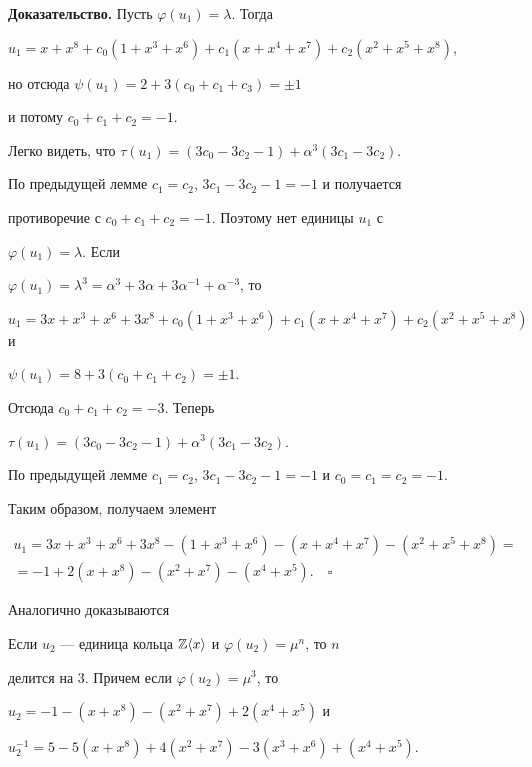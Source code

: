  


{\bf Доказательство.} Пусть $\varphi(u_1)=\lambda$. Тогда 


$u_1=x+x^8+c_0(1+x^3+x^6)+c_1(x+x^4+x^7)+c_2(x^2+x^5+x^8)$, 


но отсюда $\psi(u_1)=2+3(c_0+c_1+c_3)=\pm1$ 


и потому $c_0+c_1+c_2=-1$. 


Легко видеть, что $\tau(u_1)=(3c_0-3c_2-1)+\alpha^3(3c_1-3c_2)$. 


По предыдущей лемме $c_1=c_2$, $3c_1-3c_2-1=-1$ и получается 


противоречие с $c_0+c_1+c_2=-1$. Поэтому нет единицы $u_1$ с 


$\varphi(u_1)=\lambda$. Если 


$\varphi(u_1)=\lambda^3=\alpha^3+3\alpha+3\alpha^{-1}+\alpha^{-3}$, то 


$u_1=3x+x^3+x^6+3x^8+c_0(1+x^3+x^6)+c_1(x+x^4+x^7)+c_2(x^2+x^5+x^8)$ и 


$\psi(u_1)=8+3(c_0+c_1+c_2)=\pm1$. 


Отсюда $c_0+c_1+c_2=-3$. Теперь 


$\tau(u_1)=(3c_0-3c_2-1)+\alpha^3(3c_1-3c_2)$. 


По предыдущей лемме $c_1=c_2$, $3c_1-3c_2-1=-1$ и $c_0=c_1=c_2=-1$. 


Таким образом, получаем элемент 


\begin{multline*} 


u_1=3x+x^3+x^6+3x^8-(1+x^3+x^6)-(x+x^4+x^7)- 


(x^2+x^5+x^8) = \\ 


% 


=-1+2(x+x^8)-(x^2+x^7)-(x^4+x^5).\quad\square 


\end{multline*} 


 


Аналогично доказываются 


 


\begin{lem} 


Если $u_2$ --- единица кольца $\Bbb Z\langle x\rangle$ и $\varphi(u_2)=\mu^n$, то $n$ 


делится на $3$. Причем если $\varphi(u_2)=\mu^3$, то 


$u_2=-1-(x+x^8)-(x^2+x^7)+2(x^4+x^5)$ и 


$u^{-1}_2=5-5(x+x^8)+4(x^2+x^7)-3(x^3+x^6)+(x^4+x^5)$. 


\end{lem} 


